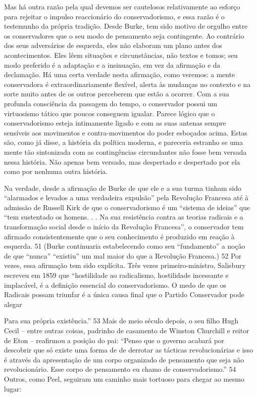 Mas há outra razão pela qual devemos ser cautelosos relativamente ao esforço para rejeitar o impulso reaccionário do conservadorismo, e essa razão é o testemunho da própria tradição. Desde Burke, tem sido motivo de orgulho entre os conservadores que o seu modo de pensamento seja contingente. Ao contrário dos seus adversários de esquerda, eles não elaboram um plano antes dos acontecimentos. Eles lêem situações e circunstâncias, não textos e tomos; seu modo preferido é a adaptação e a insinuação, em vez da afirmação e da declamação. Há uma certa verdade nesta afirmação, como veremos: a mente conservadora é extraordinariamente flexível, alerta às mudanças no contexto e na sorte muito antes de os outros perceberem que estão a ocorrer. Com a sua profunda consciência da passagem do tempo, o conservador possui um virtuosismo tático que poucos conseguem igualar. Parece lógico que o conservadorismo esteja intimamente ligado e com as suas antenas sempre sensíveis aos movimentos e contra-movimentos do poder esboçados acima. Estas são, como já disse, a história da política moderna, e pareceria estranho se uma mente tão sintonizada com as contingências circundantes não fosse bem versada nessa história. Não apenas bem versado, mas despertado e despertado por ela como por nenhuma outra história.
 \par 
Na verdade, desde a afirmação de Burke de que ele e a sua turma tinham sido “alarmados e levados a uma verdadeira expulsão” pela Revolução Francesa até à admissão de Russell Kirk de que o conservadorismo é um “sistema de ideias” que “tem sustentado os homens. . . Na sua resistência contra as teorias radicais e a transformação social desde o início da Revolução Francesa”, o conservador tem afirmado consistentemente que o seu conhecimento é produzido em reação à esquerda. {\color{blue}51} (Burke continuaria estabelecendo como seu “fundamento” a noção de que “nunca” “existiu” um mal maior do que a Revolução Francesa.) {\color{blue}52} Por vezes, essa afirmação tem sido explícita. Três vezes primeiro-ministro, Salisbury escreveu em 1859 que “hostilidade ao radicalismo, hostilidade incessante e implacável, é a definição essencial do conservadorismo. O medo de que os Radicais possam triunfar é a única causa final que o Partido Conservador pode alegar
 \par 
Para sua própria existência.” {\color{blue}53} Mais de meio século depois, o seu filho Hugh Cecil – entre outras coisas, padrinho de casamento de Winston Churchill e reitor de Eton – reafirmou a posição do pai: “Penso que o governo acabará por descobrir que só existe uma forma de de derrotar as tácticas revolucionárias e isso é através da apresentação de um corpo organizado de pensamento que seja não revolucionário. Esse corpo de pensamento eu chamo de conservadorismo.” {\color{blue}54} Outros, como Peel, seguiram um caminho mais tortuoso para chegar ao mesmo lugar:
